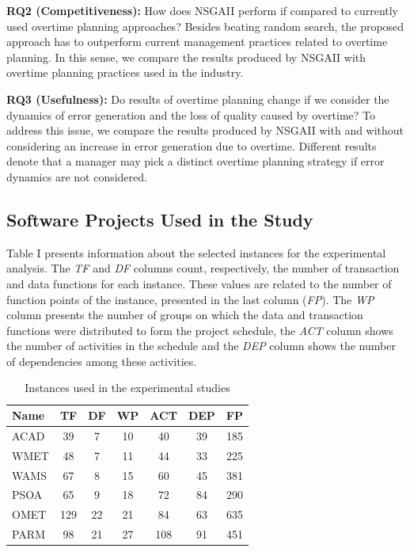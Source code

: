 \documentclass[conference]{IEEEtran}
\begin{document}
\noindent
\textbf{RQ2 (Competitiveness):} How does NSGAII perform if compared to currently used overtime planning approaches? Besides beating random search, the proposed approach has to outperform current management practices related to overtime planning. In this sense, we compare the results produced by NSGAII with overtime planning practices used in the industry.

\noindent
\textbf{RQ3 (Usefulness):} Do results of overtime planning change if we consider the dynamics of error generation and the loss of quality caused by overtime? To address this issue, we compare the results produced by NSGAII with and without considering an increase in error generation due to overtime. Different results denote that a manager may pick a distinct overtime planning strategy if error dynamics are not considered.

\subsection{Software Projects Used in the Study}

Table I presents information about the selected instances for the experimental analysis. The {\it TF} and {\it DF} columns count, respectively, the number of transaction and data functions for each instance. These values are related to the number of function points of the instance, presented in the last column ({\it FP}). The {\it WP} column presents the number of groups on which the data and transaction functions were distributed to form the project schedule, the {\it ACT} column shows the number of activities in the schedule and the {\it DEP} column shows the number of dependencies among these activities.

\begin{table}[htbp]
  \centering
  \caption{Instances used in the experimental studies}
    \begin{tabular}
		{lcccccc
		}
    \toprule
		Name & TF & DF & WP & ACT & DEP & FP \\
    \midrule
    ACAD  & 39    & 7     & 10    &  40  &  39  & 185 \\
    WMET  & 48    & 7     & 11    &  44  &  33  & 225 \\
    WAMS  & 67    & 8     & 15    &  60  &  45  & 381 \\
    PSOA  & 65    & 9     & 18    &  72  &  84  & 290 \\
    OMET  & 129   & 22    & 21    &  84  &  63  & 635 \\
    PARM  & 98    & 21    & 27    & 108  &  91  & 451 \\
    \bottomrule
    \end{tabular}%
\end{table}%
\end{document}
